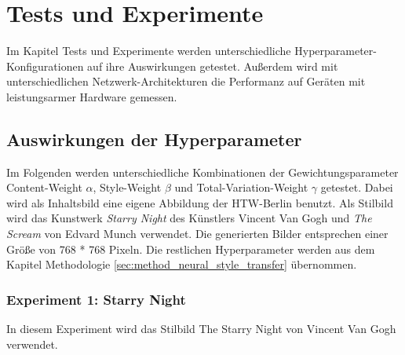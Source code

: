 \chapter{Tests und Experimente}
\label{cha:tests}

Im Kapitel Tests und Experimente werden unterschiedliche Hyperparameter-Konfigurationen auf ihre Auswirkungen getestet. Außerdem wird mit unterschiedlichen
Netzwerk-Architekturen die Performanz auf Geräten mit leistungsarmer Hardware gemessen.

\section{Auswirkungen der Hyperparameter}

Im Folgenden werden unterschiedliche Kombinationen der Gewichtungsparameter Content-Weight $ \alpha $, Style-Weight $ \beta $ und Total-Variation-Weight $ \gamma $ getestet. Dabei wird als Inhaltsbild  eine eigene Abbildung der HTW-Berlin benutzt. Als Stilbild wird das Kunstwerk \textit{Starry Night} des Künstlers Vincent Van Gogh und \textit{The Scream} von Edvard Munch verwendet. Die generierten Bilder entsprechen einer Größe von 768 * 768 Pixeln. Die restlichen Hyperparameter werden aus dem Kapitel Methodologie \ref{sec:method_neural_style_transfer} übernommen.

\pagebreak

\subsection{Experiment 1: Starry Night}

In diesem Experiment wird das Stilbild The Starry Night von Vincent Van Gogh verwendet.

